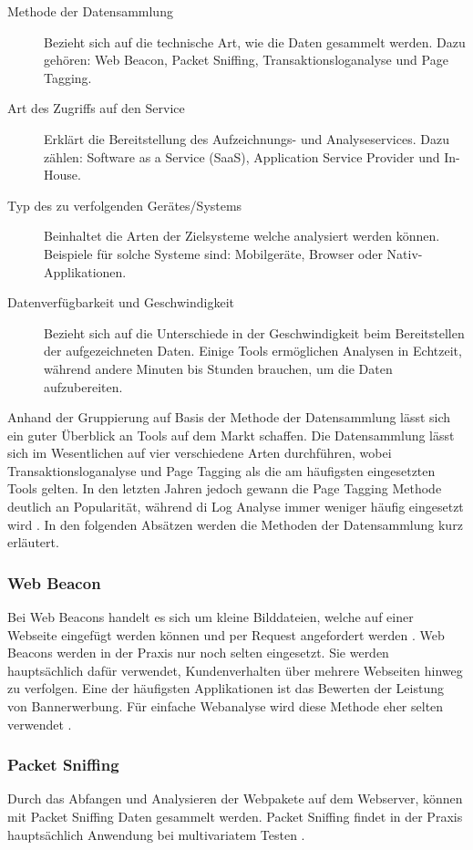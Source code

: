 \begin{description}
  \item[Methode der Datensammlung] Bezieht sich auf die technische Art, wie die Daten gesammelt werden. Dazu gehören: Web Beacon, Packet Sniffing, Transaktionsloganalyse und Page Tagging.  
  \item[Art des Zugriffs auf den Service] Erklärt die Bereitstellung des Aufzeichnungs- und Analyseservices. Dazu zählen: Software as a Service (SaaS), Application Service Provider und In-House.
  \item[Typ des zu verfolgenden Gerätes/Systems] Beinhaltet die Arten der Zielsysteme welche analysiert werden können. Beispiele für solche Systeme sind: Mobilgeräte, Browser oder Nativ-Applikationen.
  \item[Datenverfügbarkeit und Geschwindigkeit] Bezieht sich auf die Unterschiede in der Geschwindigkeit beim Bereitstellen der aufgezeichneten Daten. Einige Tools ermöglichen Analysen in Echtzeit, während andere Minuten bis Stunden brauchen, um die Daten aufzubereiten.
\end{description}

Anhand der Gruppierung auf Basis der Methode der Datensammlung lässt sich ein guter Überblick an Tools auf dem Markt schaffen. Die Datensammlung lässt sich im Wesentlichen auf vier verschiedene Arten durchführen, wobei Transaktionsloganalyse und Page Tagging als die am häufigsten eingesetzten Tools gelten. In den letzten Jahren jedoch gewann die Page Tagging Methode deutlich an Popularität, während di Log Analyse immer weniger häufig eingesetzt wird \parencite{nakatani2011toolselectionmethod}. In den folgenden Absätzen werden die Methoden der Datensammlung kurz erläutert.

\subsubsection{Web Beacon} 
Bei Web Beacons handelt es sich um kleine Bilddateien, welche auf einer Webseite eingefügt werden können und per Request angefordert werden \parencite[S. 173]{nakatani2011toolselectionmethod}. Web Beacons werden in der Praxis nur noch selten eingesetzt. Sie werden hauptsächlich dafür verwendet, Kundenverhalten über mehrere Webseiten hinweg zu verfolgen. Eine der häufigsten Applikationen ist das Bewerten der Leistung von Bannerwerbung. Für einfache Webanalyse wird diese Methode eher selten verwendet \parencite[S. 3]{waisberg2009webShort}.

\subsubsection{Packet Sniffing}
Durch das Abfangen und Analysieren der Webpakete auf dem Webserver, können mit Packet Sniffing Daten gesammelt werden. Packet Sniffing findet in der Praxis hauptsächlich Anwendung bei multivariatem Testen \parencite[S. 4]{waisberg2009webShort}.


